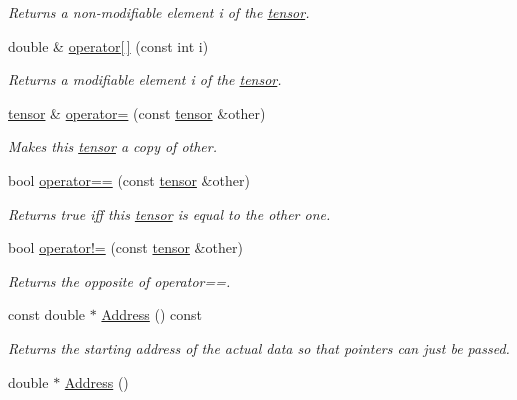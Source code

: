 \begin{DoxyCompactItemize}
\begin{DoxyCompactList}\small\item\em Returns a non-\/modifiable element i of the \hyperlink{classJKBuilder_1_1tensor}{tensor}. \item\end{DoxyCompactList}\item 
double \& \hyperlink{classJKBuilder_1_1tensor_a38c9fed6b117f7cf8b76785648d76b62}{operator\mbox{[}$\,$\mbox{]}} (const int i)
\begin{DoxyCompactList}\small\item\em Returns a modifiable element i of the \hyperlink{classJKBuilder_1_1tensor}{tensor}. \item\end{DoxyCompactList}\item 
\hyperlink{classJKBuilder_1_1tensor}{tensor} \& \hyperlink{classJKBuilder_1_1tensor_a29113cbfe726b02b94576f631c983386}{operator=} (const \hyperlink{classJKBuilder_1_1tensor}{tensor} \&other)
\begin{DoxyCompactList}\small\item\em Makes this \hyperlink{classJKBuilder_1_1tensor}{tensor} a copy of other. \item\end{DoxyCompactList}\item 
bool \hyperlink{classJKBuilder_1_1tensor_a10ae0b61e655854d12c6465d2b9e3506}{operator==} (const \hyperlink{classJKBuilder_1_1tensor}{tensor} \&other)
\begin{DoxyCompactList}\small\item\em Returns true iff this \hyperlink{classJKBuilder_1_1tensor}{tensor} is equal to the other one. \item\end{DoxyCompactList}\item 
bool \hyperlink{classJKBuilder_1_1tensor_a9b42dd835ddf2eb1a26b5d525b59b2b8}{operator!=} (const \hyperlink{classJKBuilder_1_1tensor}{tensor} \&other)
\begin{DoxyCompactList}\small\item\em Returns the opposite of operator==. \item\end{DoxyCompactList}\item 
const double $\ast$ \hyperlink{classJKBuilder_1_1tensor_a6a4e024f566d3bf9ba32a349afc5bbcf}{Address} () const 
\begin{DoxyCompactList}\small\item\em Returns the starting address of the actual data so that pointers can just be passed. \item\end{DoxyCompactList}\item 
double $\ast$ \hyperlink{classJKBuilder_1_1tensor_ac982d9eb84092bfc13694448dd824cbc}{Address} ()
\end{DoxyCompactItemize}
